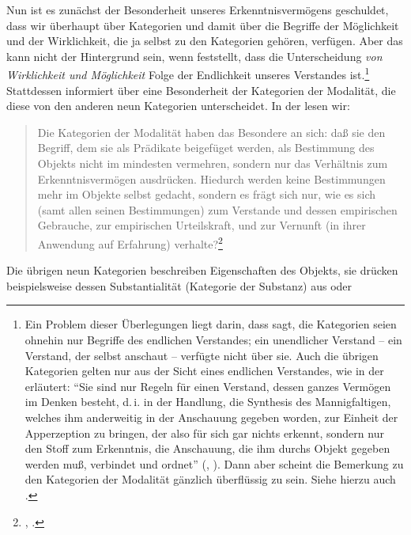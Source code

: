 Nun ist es zunächst der Besonderheit unseres Erkenntnisvermögens geschuldet,
dass wir überhaupt über Kategorien und damit über die Begriffe der
Möglichkeit und der Wirklichkeit, die ja selbst zu den Kategorien
gehören, verfügen. Aber das kann nicht  der Hintergrund sein, wenn
 feststellt, dass die Unterscheidung \emph{von 
Wirklichkeit und Möglichkeit} Folge der Endlichkeit unseres Verstandes
ist.\footnote{Ein Problem  dieser Überlegungen liegt darin, dass
 sagt, die Kategorien seien ohnehin nur Begriffe des
endlichen Verstandes; ein unendlicher Verstand -- ein Verstand, der selbst anschaut --
verfügte nicht über sie. Auch die übrigen Kategorien gelten nur aus der Sicht
eines endlichen Verstandes, wie  in der  erläutert:
\enquote{Sie sind nur Regeln für einen Verstand, dessen ganzes Vermögen im Denken
besteht, d.\,i. in der Handlung, die Synthesis des Mannigfaltigen, welches ihm
anderweitig in der Anschauung gegeben worden, zur Einheit der Apperzeption zu
bringen, der also für sich gar nichts erkennt, sondern nur den Stoff zum
Erkenntnis, die Anschauung, die ihm durchs Objekt gegeben werden muß, verbindet
und ordnet} \mkbibparens{\cite[][\S~21]{Kant:KritikderreinenVernunft2003},
\cite[][III: 116.18--23]{Kant:GesammelteWerke1900ff.}}. Dann aber scheint die
Bemerkung zu den Kategorien der Modalität gänzlich überflüssig zu sein. Siehe
hierzu auch \cite[][\pno~356\,f.]{Leech:MakingModalDistinctions2014}.}
Stattdessen informiert  über eine Besonderheit der Kategorien der
Modalität, die diese von den anderen neun Kategorien unterscheidet. In der
 lesen wir:
\begin{quote}
Die Kategorien der Modalität haben das Besondere an sich: daß sie den Begriff,
dem sie als Prädikate beigefüget werden, als Bestimmung des Objekts nicht im
mindesten vermehren, sondern nur das Verhältnis zum Erkenntnisvermögen
ausdrücken. {\punkt} Hiedurch werden keine Bestimmungen mehr im Objekte selbst
gedacht, sondern es frägt sich nur, wie es sich (samt allen seinen Bestimmungen)
zum Verstande und dessen empirischen Gebrauche, zur empirischen Urteilskraft,
und zur Vernunft (in ihrer Anwendung auf Erfahrung)
verhalte?\footnote{\cite[][B 266]{Kant:KritikderreinenVernunft2003},
\cite[][III: 186.4--14]{Kant:GesammelteWerke1900ff.}.}
\end{quote}
Die übrigen neun Kategorien beschreiben Eigenschaften des Objekts, sie drücken
beispielsweise dessen Substantialität (Kategorie der Substanz) aus oder
